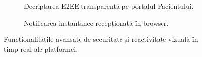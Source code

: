\begin{figure}[H]
    \centering
    \begin{subfigure}[b]{0.49\textwidth}
        \centering
        \color{red}
        \caption{Decriptarea E2EE transparentă pe portalul Pacientului.}
        \label{fig:screenshot_patient_dashboard}
    \end{subfigure}
    \hfill
    \begin{subfigure}[b]{0.49\textwidth}
        \centering
        \color{red}
        \caption{Notificarea instantanee recepționată în browser.}
        \label{fig:screenshot_notifications}
    \end{subfigure}
    \caption{Funcționalitățile avansate de securitate și reactivitate vizuală în timp real ale platformei.}
    \label{fig:security_and_notifications}
\end{figure}